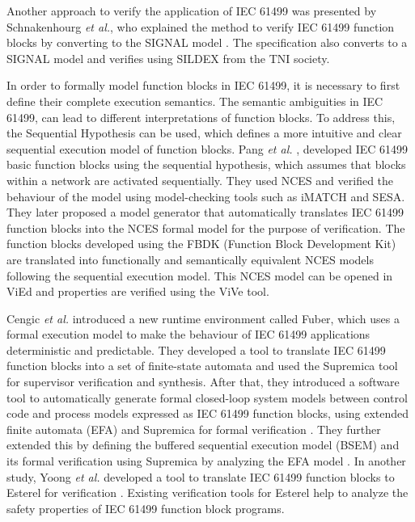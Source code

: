 \begin{bibunit}
Another approach to verify the application of IEC 61499 was presented by Schnakenhourg \textit{et al.}, who explained the method to verify IEC 61499 function blocks by converting to the SIGNAL model \cite{schnakenbourg2002towards}. The specification also converts to a SIGNAL model and verifies using SILDEX from the TNI society.

In order to formally model function blocks in IEC 61499, it is necessary to first define their complete execution semantics. The semantic ambiguities in IEC 61499, can lead to different interpretations of function blocks. To address this, the Sequential Hypothesis can be used, which defines a more intuitive and clear sequential execution model of function blocks. Pang \textit{et al.} \cite{pang2007towards},  developed IEC 61499 basic function  blocks using the sequential hypothesis, which assumes that blocks within a network are activated sequentially. They used NCES and verified the behaviour of the model using model-checking tools such as iMATCH and SESA. They later proposed a model generator \cite{pang2008automatic} that automatically translates IEC 61499 function blocks into the NCES formal model for the purpose of verification. The function blocks developed using the FBDK (Function Block Development Kit) are translated into functionally and semantically equivalent NCES models following the sequential execution model. This NCES model can be opened in ViEd and properties are verified using the ViVe tool.

Cengic \textit{et al.} \cite{cengic2006formal} introduced a new runtime environment called Fuber, which uses a formal execution model to make the behaviour of IEC 61499 applications deterministic and predictable. They developed a tool to translate IEC 61499 function blocks into a set of finite-state automata and used the Supremica tool for supervisor verification and synthesis. After that, they  introduced a software tool to automatically generate formal closed-loop system models between control code and process models expressed as IEC 61499 function blocks, using extended finite automata (EFA) and Supremica for formal verification \cite{vcengic2008control}. They further extended this by defining the buffered sequential execution model (BSEM) and its formal verification using Supremica by analyzing the EFA model \cite{cengic2008definition}. In another study, Yoong \textit{et al.} developed a tool to translate IEC 61499 function blocks to Esterel for verification \cite{yoong2010verifying}.  Existing verification tools for Esterel help to analyze the safety properties of IEC 61499 function block programs.


\end{bibunit}
